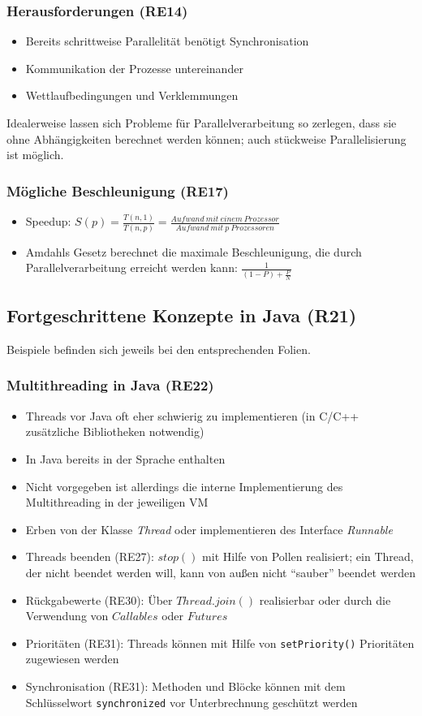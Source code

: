 \subsubsection{Herausforderungen (RE14)}
\begin{itemize}
	\item Bereits schrittweise Parallelität benötigt Synchronisation
	\item Kommunikation der Prozesse untereinander
	\item Wettlaufbedingungen und Verklemmungen
\end{itemize}
Idealerweise lassen sich Probleme für Parallelverarbeitung so zerlegen, dass sie ohne Abhängigkeiten berechnet werden können; auch stückweise Parallelisierung ist möglich.

\subsubsection{Mögliche Beschleunigung (RE17)}
\begin{itemize}
	\item Speedup: \(S(p) = \frac{T(n,1)}{T(n,p)} = \frac{Aufwand~mit~einem~Prozessor}{Aufwand~mit~p~Prozessoren}\)
	\item Amdahls Gesetz berechnet die maximale Beschleunigung, die durch Parallelverarbeitung erreicht werden kann: \(\frac{1}{(1-P)+\frac{P}{N}}\)
\end{itemize}


\subsection{Fortgeschrittene Konzepte in Java (R21)}
Beispiele befinden sich jeweils bei den entsprechenden Folien.

\subsubsection{Multithreading in Java (RE22)}
\begin{itemize}
	\item Threads vor Java oft eher schwierig zu implementieren (in C/C++ zusätzliche Bibliotheken notwendig)
	\item In Java bereits in der Sprache enthalten
	\item Nicht vorgegeben ist allerdings die interne Implementierung des Multithreading in der jeweiligen VM
	\item Erben von der Klasse \textit{Thread} oder implementieren des Interface \textit{Runnable}
	\item Threads beenden (RE27): \(stop()\) mit Hilfe von Pollen realisiert; ein Thread, der nicht beendet werden will, kann von außen nicht "`sauber"' beendet werden
	\item Rückgabewerte (RE30): Über \(Thread.join()\) realisierbar oder durch die Verwendung von \(Callables\) oder \(Futures\)
	\item Prioritäten (RE31): Threads können mit Hilfe von \texttt{setPriority()} Prioritäten zugewiesen werden
	\item Synchronisation (RE31): Methoden und Blöcke können mit dem Schlüsselwort \texttt{synchronized} vor Unterbrechnung geschützt werden
\end{itemize}

